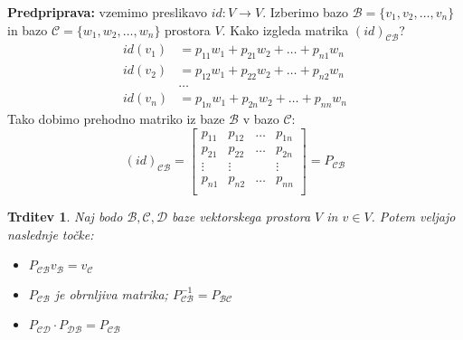 \documentclass[10pt, a4paper]{article}
\newtheorem{trditev}[izr]{Trditev}
\begin{document}
\textbf{Predpriprava:} vzemimo preslikavo  $id: V \rightarrow V$.
Izberimo bazo $\mathcal{B} = \{v_1, v_2, \dots, v_n\}$ in bazo $\mathcal{C} = \{w_1, w_2, \dots, w_n\}$ prostora $V$.
Kako izgleda matrika $(id)_\mathcal{CB}$?
\begin{align*}
    id(v_1) &= p_{11} w_1 + p_{21} w_2 + \dots + p_{n1} w_n\\
    id(v_2) &= p_{12} w_1 + p_{22} w_2 + \dots + p_{n2} w_n\\
    &\dots\\
    id(v_n) &= p_{1n} w_1 + p_{2n} w_2 + \dots + p_{nn} w_n
\end{align*}
Tako dobimo prehodno matriko iz baze $\mathcal{B}$ v bazo $\mathcal{C}$:
$$(id)_\mathcal{CB} = \begin{bmatrix}
    p_{11} & p_{12} & \dots & p_{1n}\\
    p_{21} & p_{22} & \dots & p_{2n}\\
    \vdots & \vdots & &\vdots\\
    p_{n1} & p_{n2} & \dots & p_{nn}\\
\end{bmatrix} = P_\mathcal{CB}$$

\begin{trditev}
    Naj bodo $\mathcal{B,C,D}$ baze vektorskega prostora $V$ in $v \in V$. Potem veljajo naslednje točke:
    \begin{itemize}
        \item $P_\mathcal{CB} v_\mathcal{B} = v_\mathcal{C}$
        \item $P_\mathcal{CB}$ je obrnljiva matrika; $P_\mathcal{CB}^{-1} = P_\mathcal{BC}$
        \item $P_\mathcal{CD} \cdot P_\mathcal{DB} = P_\mathcal{CB}$
    \end{itemize}
\end{trditev}
\end{document}
